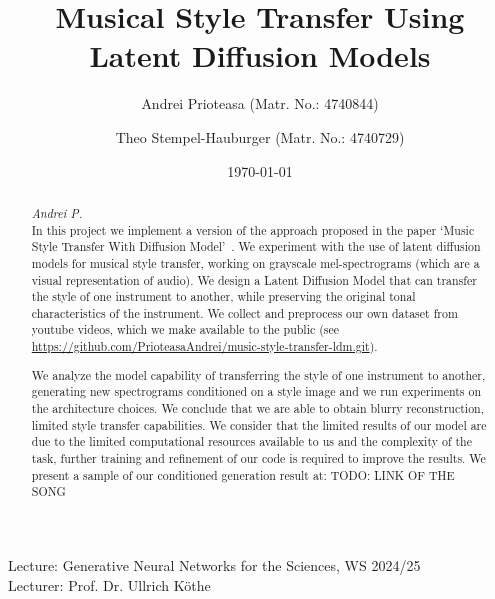 \documentclass[12pt]{article}
\title{Musical Style Transfer Using Latent Diffusion Models}
\author{Andrei Prioteasa (Matr. No.: 4740844) \and Theo Stempel-Hauburger (Matr. No.: 4740729)}
\date{\today}
\newcommand{\lecturename}{Lecture: Generative Neural Networks for the Sciences, WS 2024/25}
\newcommand{\lecturer}{Lecturer: Prof. Dr. Ullrich Köthe}
\begin{document}
\maketitle
\begin{center}
    \lecturename \\
    \lecturer
\end{center}

\tableofcontents
\begin{abstract}
    \textit{Andrei P.}\\
    \noindent In this project we implement a version of the approach proposed in the paper `Music Style Transfer With Diffusion Model'~\cite{huang2024music}. We experiment with the use of latent diffusion models for musical style transfer, working on grayscale mel-spectrograms (which are a visual representation of audio). We design a Latent Diffusion Model that can transfer the style of one instrument to another, while preserving the original tonal characteristics of the instrument. We collect and preprocess our own dataset from youtube videos, which we make available to the public (see \url{https://github.com/PrioteasaAndrei/music-style-transfer-ldm.git}). 
    
    We analyze the model capability of transferring the style of one instrument to another, generating new spectrograms conditioned on a style image and we run experiments on the architecture choices. We conclude that we are able to obtain blurry reconstruction, limited style transfer capabilities. We consider that the limited results of our model are due to the limited computational resources available to us and the complexity of the task, further training and refinement of our code is required to improve the results. We present a sample of our conditioned generation result at: TODO: LINK OF THE SONG
   
\end{abstract}










\end{document}
